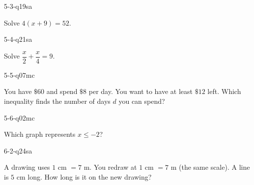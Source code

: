 \begin{practiceQuestion}{5-3-q19}{sa}
\begin{questionText}
Solve $4(x + 9) = 52$.
\end{questionText}
\end{practiceQuestion}

\begin{practiceQuestion}{5-4-q21}{sa}
\begin{questionText}
Solve $\dfrac{x}{2} + \dfrac{x}{4} = 9$.
\end{questionText}
\end{practiceQuestion}

\begin{practiceQuestion}{5-5-q07}{mc}
\begin{questionText}
You have $\$60$ and spend $\$8$ per day. You want to have at least $\$12$ left. Which inequality finds the number of days $d$ you can spend?
\end{questionText}
\end{practiceQuestion}

\begin{practiceQuestion}{5-6-q02}{mc}
\begin{questionText}
Which graph represents $x \leq -2$?
\end{questionText}
\end{practiceQuestion}

\begin{practiceQuestion}{6-2-q24}{sa}
\begin{questionText}
A drawing uses $1$ cm $= 7$ m. You redraw at $1$ cm $= 7$ m (the same scale). A line is $5$ cm long. How long is it on the new drawing?
\end{questionText}
\end{practiceQuestion}

